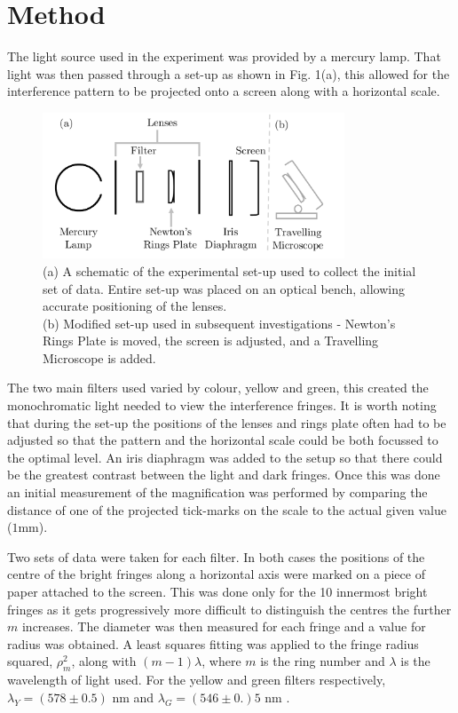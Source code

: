 \documentclass[twocolumn]{revtex4}
\newcommand{\squeezeup}{\vspace{-2.5mm}}
\begin{document}
\vspace{-3ex}
\section{Method} 
\vspace{-2ex}
The light source used in the experiment was provided by a mercury lamp. That light was then passed through a set-up as shown in Fig. 1(a), this allowed for the interference pattern to be projected onto a screen along with a horizontal scale. 

\begin{figure}[!h]
\begin{center}
\includegraphics[width=9cm]{fig1}
\caption[]{(a) A schematic of the experimental set-up used to collect the initial set of data. Entire set-up was placed on an optical bench, allowing accurate positioning of the lenses.
\\
(b) Modified set-up used in subsequent investigations - Newton's Rings Plate is moved, the screen is adjusted, and a Travelling Microscope is added.}
\label{fig:fig1}
\end{center}
\end{figure}

\squeezeup
\squeezeup

The two main filters used varied by colour, yellow and green, this created the monochromatic light needed to view the interference fringes. It is worth noting that during the set-up the positions of the lenses and rings plate often had to be adjusted so that the pattern and the horizontal scale could be both focussed to the optimal level. An iris diaphragm was added to the setup so that there could be the greatest contrast between the light and dark fringes. Once this was done an initial measurement of the magnification was performed by comparing the distance of one of the projected tick-marks on the scale to the actual given value ($1$mm). 

Two sets of data were taken for each filter. In both cases the positions of the centre of the bright fringes along a horizontal axis were marked on a piece of paper attached to the screen. This was done only for the 10 innermost bright fringes as it gets progressively more difficult to distinguish the centres the further $m$ increases. The diameter was then measured for each fringe and a value for radius was obtained. A least squares fitting was applied to the fringe radius squared, $\rho_m^2$, along with $(m-1)\lambda$, where $m$ is the ring number and $\lambda$ is the wavelength of light used. For the yellow and green filters respectively, $\lambda_Y = (578\pm0.5)$ nm and $\lambda_G = (546 \pm 0.)5$ nm \cite{labscript}.
\end{document}
